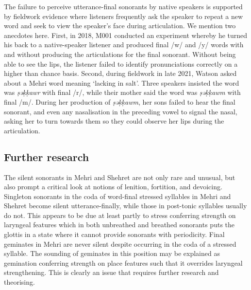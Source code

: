 \documentclass[output=paper]{langscibook}
\begin{document}
{The failure to perceive utterance-final sonorants by native speakers is supported by fieldwork evidence where listeners frequently ask the speaker to repeat a new word and seek to view the speaker’s face during articulation. We mention two anecdotes here. First, in 2018, M001 conducted an experiment whereby he turned his back to a native-speaker listener and produced final \mbox{/w/} and \mbox{/y/} words with and without producing the articulations for the final sonorant. Without being able to see the lips, the listener failed to identify pronunciations correctly on a higher than chance basis. Second, during fieldwork in late 2021, Watson asked about a Mehri word meaning ‘lacking in salt’. Three speakers insisted the word was \textit{ṣəḳḳawr} with final \mbox{/r/}, while their mother said the word was \textit{ṣəḳḳawm} with final \mbox{/m/}. During her production of \textit{ṣəḳḳawm}, her sons failed to hear the final sonorant, and even any nasalisation in the preceding vowel to signal the nasal, asking her to turn towards them so they could observe her lips during the articulation.}

\subsection{Further research} %
\label{sec:watson:5.4}
The silent sonorants in Mehri and Shehret are not only rare and unusual, but also prompt a critical look at notions of lenition, fortition, and devoicing. Singleton sonorants in the coda of word-final stressed syllables in Mehri and Shehret become silent utterance-finally, while those in post-tonic syllables usually do not. This appears to be due at least partly to stress conferring strength on laryngeal features which in both unbreathed and breathed sonorants puts the glottis in a state where it cannot provide sonorants with periodicity. Final geminates in Mehri are never silent despite occurring in the coda of a stressed syllable. The sounding of geminates in this position may be explained as gemination conferring strength on place features such that it overrides laryngeal strengthening. This is clearly an issue that requires further research and theorising.
\end{document}
